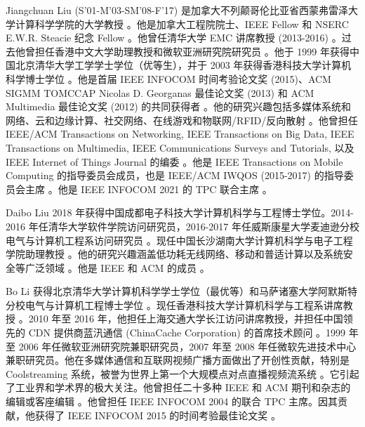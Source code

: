 \documentclass[journal]{IEEEtran}
\begin{document}
\begin{IEEEbiography}[{\rule{1in}{1.25in}}]{Jiangchuan Liu}
(S'01-M'03-SM'08-F'17) 是加拿大不列颠哥伦比亚省西蒙弗雷泽大学计算科学学院的大学教授 。他是加拿大工程院院士、IEEE Fellow 和 NSERC E.W.R. Steacie 纪念 Fellow 。他曾任清华大学 EMC 讲席教授 (2013-2016) 。过去他曾担任香港中文大学助理教授和微软亚洲研究院研究员 。他于 1999 年获得中国北京清华大学工学学士学位（优等生），并于 2003 年获得香港科技大学计算机科学博士学位 。他是首届 IEEE INFOCOM 时间考验论文奖 (2015)、ACM SIGMM TOMCCAP Nicolas D. Georganas 最佳论文奖 (2013) 和 ACM Multimedia 最佳论文奖 (2012) 的共同获得者 。他的研究兴趣包括多媒体系统和网络、云和边缘计算、社交网络、在线游戏和物联网/RFID/反向散射 。他曾担任 IEEE/ACM Transactions on Networking, IEEE Transactions on Big Data, IEEE Transactions on Multimedia, IEEE Communications Surveys and Tutorials, 以及 IEEE Internet of Things Journal 的编委 。他是 IEEE Transactions on Mobile Computing 的指导委员会成员，也是 IEEE/ACM IWQOS (2015-2017) 的指导委员会主席 。他是 IEEE INFOCOM 2021 的 TPC 联合主席 。
\end{IEEEbiography}

\begin{IEEEbiography}[{\rule{1in}{1.25in}}]{Daibo Liu}
2018 年获得中国成都电子科技大学计算机科学与工程博士学位。2014-2016 年任清华大学软件学院访问研究员，2016-2017 年任威斯康星大学麦迪逊分校电气与计算机工程系访问研究员 。现任中国长沙湖南大学计算机科学与电子工程学院助理教授 。他的研究兴趣涵盖低功耗无线网络、移动和普适计算以及系统安全等广泛领域 。他是 IEEE 和 ACM 的成员 。
\end{IEEEbiography}

\begin{IEEEbiography}[{\rule{1in}{1.25in}}]{Bo Li}
获得北京清华大学计算机科学学士学位（最优等）和马萨诸塞大学阿默斯特分校电气与计算机工程博士学位 。现任香港科技大学计算机科学与工程系讲席教授 。2010 年至 2016 年，他担任上海交通大学长江访问讲席教授，并担任中国领先的 CDN 提供商蓝汛通信 (ChinaCache Corporation) 的首席技术顾问 。1999 年至 2006 年任微软亚洲研究院兼职研究员，2007 年至 2008 年任微软先进技术中心兼职研究员。他在多媒体通信和互联网视频广播方面做出了开创性贡献，特别是 Coolstreaming 系统，被誉为世界上第一个大规模点对点直播视频流系统 。它引起了工业界和学术界的极大关注。他曾担任二十多种 IEEE 和 ACM 期刊和杂志的编辑或客座编辑 。他曾担任 IEEE INFOCOM 2004 的联合 TPC 主席。因其贡献，他获得了 IEEE INFOCOM 2015 的时间考验最佳论文奖 。
\end{IEEEbiography}
\end{document}
